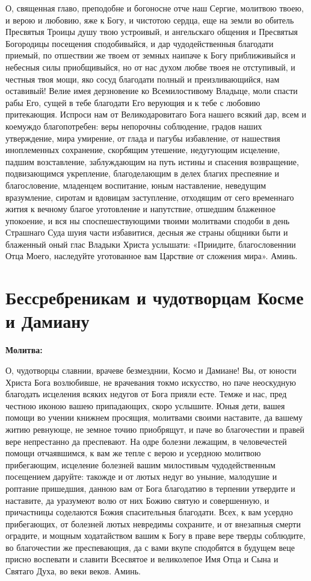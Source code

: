 О, священная главо, преподобне и богоносне отче наш Сергие, молитвою твоею, и верою и любовию, яже к Богу, и чистотою сердца, еще на земли во обитель Пресвятыя Троицы душу твою устроивый, и ангельскаго общения и Пресвятыя Богородицы посещения сподобивыйся, и дар чудодейственныя благодати приемый, по отшествии же твоем от земных наипаче к Богу приближивыйся и небесныя силы приобщивыйся, но от нас духом любве твоея не отступивый, и честныя твоя мощи, яко сосуд благодати полный и преизливающийся, нам оставивый! Велие имея дерзновение ко Всемилостивому Владыце, моли спасти рабы Его, сущей в тебе благодати Его верующия и к тебе с любовию притекающия. Испроси нам от Великодаровитаго Бога нашего всякий дар, всем и коемуждо благопотребен: веры непорочны соблюдение, градов наших утверждение, мира умирение, от глада и пагубы избавление, от нашествия иноплеменных сохранение, скорбящим утешение, недугующим исцеление, падшим возставление, заблуждающим на путь истины и спасения возвращение, подвизающимся укрепление, благоделающим в делех благих преспеяние и благословение, младенцем воспитание, юным наставление, неведущим вразумление, сиротам и вдовицам заступление, отходящим от сего временнаго жития к вечному благое уготовление и напутствие, отшедшим блаженное упокоение, и вся ны споспешествующими твоими молитвами сподоби в день Страшнаго Суда шуия части избавитися, десныя же страны общники быти и блаженный оный глас Владыки Христа услышати: «Приидите, благословеннии Отца Моего, наследуйте уготованное вам Царствие от сложения мира». Аминь.

\section{Бессребреникам и чудотворцам Косме и Дамиану}
 
\bfseries Молитва:\normalfont{}


О, чудотворцы славнии, врачеве безмезднии, Космо и Дамиане! Вы, от юности Христа Бога возлюбивше, не врачевания токмо искусство, но паче неоскудную благодать исцеления всяких недугов от Бога прияли есте. Темже и нас, пред честною иконою вашею припадающих, скоро услышите. Юныя дети, вашея помощи во учении книжнем просящия, молитвами своими наставите, да вашему житию ревнующе, не земное точию приобрящут, и паче во благочестии и правей вере непрестанно да преспевают. На одре болезни лежащим, в человечестей помощи отчаявшимся, к вам же тепле с верою и усердною молитвою прибегающим, исцеление болезней вашим милостивым чудодейственным посещением даруйте: такожде и от лютых недуг во уныние, малодушие и роптание пришедшия, данною вам от Бога благодатию в терпении утвердите и наставите, да уразумеют волю от них Божию святую и совершенную, и причастницы соделаются Божия спасительныя благодати. Всех, к вам усердно прибегающих, от болезней лютых невредимы сохраните, и от внезапныя смерти оградите, и мощным ходатайством вашим к Богу в праве вере тверды соблюдите, во благочестии же преспевающия, да с вами вкупе сподобятся в будущем веце присно воспевати и славити Всесвятое и великолепое Имя Отца и Сына и Святаго Духа, во веки веков. Аминь.

